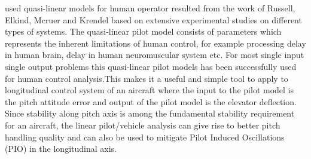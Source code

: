 used quasi-linear models for  human operator resulted from the work of Russell, Elkind, Mcruer and Krendel\cite{hess1990control} based on extensive experimental studies on different types of systems. The quasi-linear pilot model consists of parameters which represents the inherent limitations of human control, for example processing delay in human brain, delay in 
human neuromuscular system etc. For most single input single output problems this quasi-linear pilot models has been successfully used for human control analysis\cite{pool2009pilot}\cite{taylor1967comparison}\cite{ninz1982parametric}.This  makes  it  a  useful  and  simple  tool  to  apply  to longitudinal control system of an aircraft where the input to the pilot model is the pitch  attitude  error and output of the  pilot  model  is  the  elevator  deflection.  Since  stability  along  pitch  axis  is  among  the  fundamental  stability 
requirement for an aircraft, the linear pilot/vehicle analysis can give rise to better pitch handling quality and can also be used to mitigate Pilot Induced Oscillations (PIO) in the longitudinal axis.

